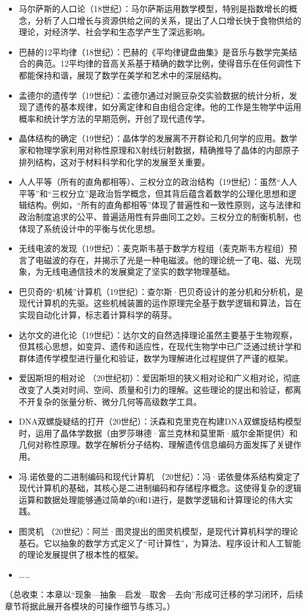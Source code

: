 \begin{itemize}
\item 马尔萨斯的人口论（18世纪）：马尔萨斯运用数学模型，特别是指数增长的概念，分析了人口增长与资源供给之间的关系，提出了人口增长快于食物供给的理论，对经济学、社会学和生态学产生了深远影响。
\item 巴赫的12平均律（18世纪）：巴赫的《平均律键盘曲集》是音乐与数学完美结合的典范。12平均律的音高关系基于精确的数学比例，使得音乐在任何调性下都能保持和谐，展现了数学在美学和艺术中的深层结构。
\item 孟德尔的遗传学（19世纪）：孟德尔通过对豌豆杂交实验数据的统计分析，发现了遗传的基本规律，如分离定律和自由组合定律。他的工作是生物学中运用概率和统计学方法的早期范例，开创了现代遗传学。
\item 晶体结构的确定（19世纪）：晶体学的发展离不开群论和几何学的应用。数学家和物理学家利用对称性原理和X射线衍射数据，精确推导了晶体的内部原子排列结构，这对于材料科学和化学的发展至关重要。
\item 人人平等（所有的直角都相等）、三权分立的政治结构（19世纪）：虽然“人人平等”和“三权分立”是政治哲学概念，但其背后蕴含着数学的公理化思想和逻辑结构。例如，“所有的直角都相等”体现了普遍性和一致性原则，这与法律和政治制度追求的公平、普遍适用性有异曲同工之妙。三权分立的制衡机制，也体现了系统设计中的平衡与优化思想。
\item 无线电波的发现（19世纪）：麦克斯韦基于数学方程组（麦克斯韦方程组）预言了电磁波的存在，并揭示了光是一种电磁波。他的理论统一了电、磁、光现象，为无线电通信技术的发展奠定了坚实的数学物理基础。
\item 巴贝奇的“机械”计算机（19世纪）：查尔斯·巴贝奇设计的差分机和分析机，是现代计算机的先驱。这些机械装置的运作原理完全基于数学逻辑和算法，旨在实现自动化计算，标志着计算科学的萌芽。
\item 达尔文的进化论（19世纪）：达尔文的自然选择理论虽然主要基于生物观察，但其核心思想，如变异、遗传和适应性，在现代生物学中已广泛通过统计学和群体遗传学模型进行量化和验证，数学为理解进化过程提供了严谨的框架。
\item 爱因斯坦的相对论 （20世纪初）：爱因斯坦的狭义相对论和广义相对论，彻底改变了人类对时间、空间、质量和引力的理解。这些理论的提出和验证，都离不开复杂的张量分析、微分几何等高级数学工具。
\item DNA双螺旋疑结的打开（20世纪）：沃森和克里克在构建DNA双螺旋结构模型时，运用了晶体学数据（由罗莎琳德·富兰克林和莫里斯·威尔金斯提供）和几何对称性原理。数学在解析分子结构、理解遗传信息编码方面发挥了关键作用。

\item 冯.诺依曼的二进制编码和现代计算机 （20世纪）：冯·诺依曼体系结构奠定了现代计算机的基础，其核心是二进制编码和存储程序概念。这使得复杂的逻辑运算和数据处理能够通过简单的0和1进行，是数学逻辑和计算理论的伟大实践。
\item 图灵机 （20世纪）：阿兰·图灵提出的图灵机模型，是现代计算机科学的理论基石。它以抽象的数学方式定义了“可计算性”，为算法、程序设计和人工智能的理论发展提供了根本性的框架。
\item ……
\end{itemize}
{（总收束：本章以“现象—抽象—启发—取舍—去向”形成可迁移的学习闭环，后续章节将据此展开各模块的可操作细节与练习。）}
